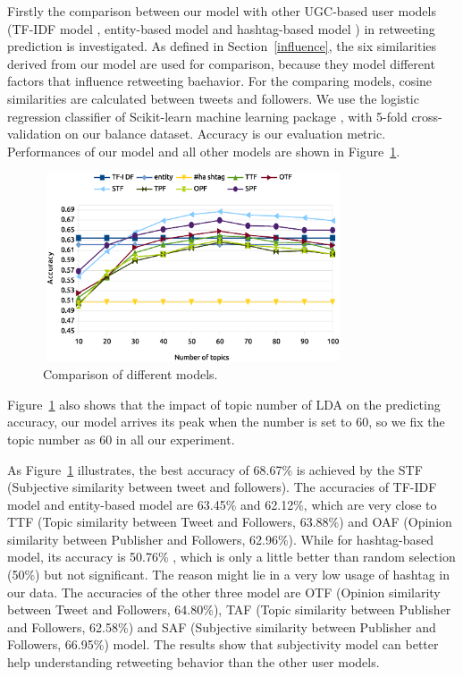\documentclass[twocolumn]{svjour3}          %
\begin{document}
Firstly the comparison between our model with other UGC-based user models (TF-IDF model \cite{Luo:2013RMF}, entity-based model and hashtag-based model \cite{abel2011analyzing}) in retweeting prediction is investigated. 
As defined in Section~\ref{influence}, the six similarities derived from our model are used for comparison, because they model different factors that influence retweeting baehavior. 
For the comparing models, cosine similarities are calculated between tweets and followers.
We use the logistic regression classifier of Scikit-learn machine learning package \cite{scikit-learn}, with 5-fold cross-validation on our balance dataset. Accuracy is our evaluation metric.
Performances of our model and all other models are shown in Figure~\ref{fig4}.
\begin{figure}[htb]
\centering
\includegraphics[width=3.5in,height=2.2in]{fig4.eps}
\caption{Comparison of different models.}
\label{fig4}
\end{figure}
Figure~\ref{fig4} also shows that the impact of topic number of LDA on the predicting accuracy, our model arrives its peak when the number is set to 60, so we fix the topic number as 60 in all our experiment. 

As Figure~\ref{fig4} illustrates, the best accuracy of 68.67\% is achieved by the STF (Subjective similarity between tweet and followers). 
The accuracies of TF-IDF model and entity-based model are 63.45\% and 62.12\%, which are very close to TTF (Topic similarity between Tweet and Followers, 63.88\%) and OAF (Opinion similarity between Publisher and Followers, 62.96\%). 
While for hashtag-based model, its accuracy is 50.76\% , which is only a little better than random selection (50\%) but not significant. The reason might lie in a very low usage of hashtag in our data. 
The accuracies of the other three model are OTF (Opinion similarity between Tweet and Followers, 64.80\%), TAF (Topic similarity between Publisher and Followers, 62.58\%) and SAF (Subjective similarity between Publisher and Followers, 66.95\%) model. 
The results show that subjectivity model can better help understanding retweeting behavior than the other user models.
\end{document}
